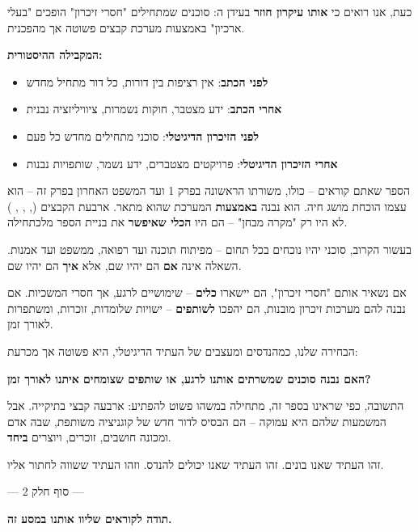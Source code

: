 כעת, אנו רואים כי \textbf{אותו עיקרון חוזר} בעידן ה: סוכנים שמתחילים "חסרי זיכרון" הופכים "בעלי ארכיון" באמצעות מערכת קבצים פשוטה אך מהפכנית.

\textbf{המקבילה ההיסטורית:}
\begin{itemize}
  \item \textbf{לפני הכתב}: אין רציפות בין דורות, כל דור מתחיל מחדש
  \item \textbf{אחרי הכתב}: ידע מצטבר, חוקות נשמרות, ציוויליזציה נבנית
  \item \textbf{לפני הזיכרון הדיגיטלי}: סוכני  מתחילים מחדש כל פעם
  \item \textbf{אחרי הזיכרון הדיגיטלי}: פרויקטים מצטברים, ידע נשמר, שותפויות נבנות
\end{itemize}

הספר שאתם קוראים – כולו, משורתו הראשונה בפרק \num{1} ועד המשפט האחרון בפרק זה – הוא עצמו הוכחת מושג חיה. הוא נבנה \textbf{באמצעות} המערכת שהוא מתאר. ארבעת הקבצים (, , , ) לא היו רק "מקרה מבחן" – הם היו \textbf{הכלי שאיפשר} את בניית הספר מלכתחילה.


בעשור הקרוב, סוכני  יהיו נוכחים בכל תחום – מפיתוח תוכנה ועד רפואה, ממשפט ועד אמנות. השאלה אינה \textbf{אם} הם יהיו שם, אלא \textbf{איך} הם יהיו שם.

אם נשאיר אותם "חסרי זיכרון", הם יישארו \textbf{כלים} – שימושיים לרגע, אך חסרי המשכיות. אם נבנה להם מערכות זיכרון מובנות, הם יהפכו \textbf{לשותפים} – ישויות שלומדות, זוכרות, ומשתפרות לאורך זמן.

הבחירה שלנו, כמהנדסים ומעצבים של העתיד הדיגיטלי, היא פשוטה אך מכרעת:

\textbf{האם נבנה סוכנים שמשרתים אותנו לרגע, או שותפים שצומחים איתנו לאורך זמן?}

התשובה, כפי שראינו בספר זה, מתחילה במשהו פשוט להפתיע: ארבעה קבצי  בתיקייה. אבל המשמעות שלהם היא עמוקה – הם הבסיס לדור חדש של קוגניציה משותפת, שבה אדם ומכונה חושבים, זוכרים, ויוצרים \textbf{ביחד}.

זהו העתיד שאנו בונים. זהו העתיד שאנו יכולים להנדס. וזהו העתיד ששווה לחתור אליו.

\vspace{1em}

\begin{center}
--- סוף חלק \num{2} ---

\vspace{0.5em}

\textbf{תודה לקוראים שליוו אותנו במסע זה.}
\end{center}

\begin{center}
\end{center}
